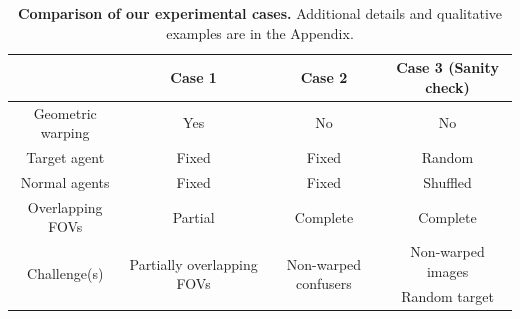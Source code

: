 


\begin{table}
\caption{
\textbf{Comparison of our experimental cases.} 
Additional details and qualitative examples are in the Appendix.
}
\label{tab:case}
\centering
\scriptsize{
\begin{tabular}{cccc}
\toprule
& Case 1 & Case 2 & Case 3 (Sanity check) \\
\midrule
Geometric warping & Yes & No & No \\
Target agent & Fixed & Fixed & Random \\
Normal agents & Fixed & Fixed & Shuffled \\
Overlapping FOVs & Partial & Complete & Complete \\
\midrule
\multirow{2}{*}{ Challenge(s) } & \multirow{2}{*}{ Partially overlapping FOVs  } & \multirow{2}{*}{ Non-warped confusers } & Non-warped images \\
& & & Random target \\

\bottomrule
\end{tabular}}
\end{table}
